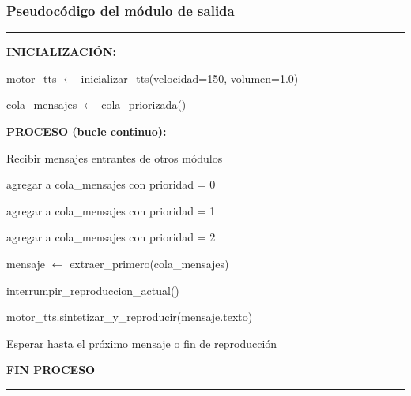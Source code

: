 \subsubsection{Pseudocódigo del módulo de salida}

\begin{center}
\label{alg:salida}
\end{center}
\vspace{-1.8cm}
\rule{\textwidth}{0.4pt}
\vspace{-0.9cm}

\begin{algorithmic}[1]

\Statex \textbf{INICIALIZACIÓN:}

\Statex motor\_tts $\gets$ inicializar\_tts(velocidad=150, volumen=1.0)

\Statex cola\_mensajes $\gets$ cola\_priorizada()

\Statex
\Statex \textbf{PROCESO (bucle continuo):}

\State Recibir mensajes entrantes de otros módulos


    \State agregar a cola\_mensajes con prioridad = 0

\EndIf

\Statex


    \State agregar a cola\_mensajes con prioridad = 1

\EndIf

\Statex


    \State agregar a cola\_mensajes con prioridad = 2

\EndIf

\Statex


    \State mensaje $\gets$ extraer\_primero(cola\_mensajes)


        \State interrumpir\_reproduccion\_actual()

    \EndIf

    \State motor\_tts.sintetizar\_y\_reproducir(mensaje.texto)

\EndIf

\Statex
\State Esperar hasta el próximo mensaje o fin de reproducción

\Statex
\Statex \textbf{FIN PROCESO}

\end{algorithmic}
\vspace{-0.9cm}
\rule{\textwidth}{0.4pt}


